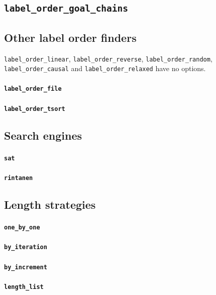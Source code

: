 \documentclass[manuscript, screen]{jair}
\newcommand{\opt}[1]{\texttt{#1}}
\begin{document}
\subsection{\texorpdfstring{\opt{label\_order\_goal\_chains}}{label\_order\_goal\_chains}}


\subsection{Other label order finders}
\opt{label\_order\_linear}, \opt{label\_order\_reverse}, \opt{label\_order\_random},
\opt{label\_order\_causal} and \opt{label\_order\_relaxed} have no options.
\paragraph{\opt{label\_order\_file}}

\paragraph{\opt{label\_order\_tsort}}


\subsection{Search engines}
\paragraph{\opt{sat}}

\paragraph{\opt{rintanen}}


\subsection{Length strategies}
\paragraph{\opt{one\_by\_one}}

\paragraph{\opt{by\_iteration}}

\paragraph{\opt{by\_increment}}

\paragraph{\opt{length\_list}}

\end{document}
